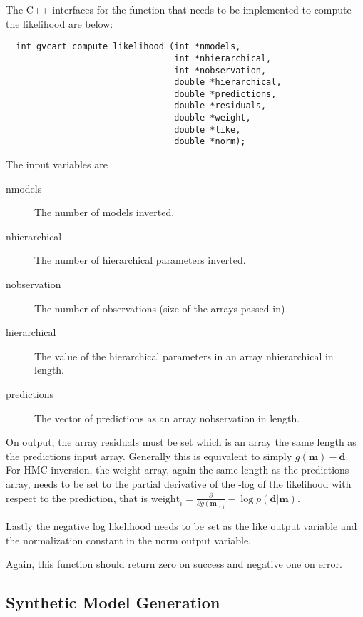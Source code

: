 \documentclass[a4paper,12pt]{article}
\begin{document}
The C++ interfaces for the function that needs to be implemented to
compute the likelihood are below:

\begin{verbatim}
  int gvcart_compute_likelihood_(int *nmodels,
                                 int *nhierarchical,
                                 int *nobservation,
                                 double *hierarchical,
                                 double *predictions, 
                                 double *residuals,
                                 double *weight,
                                 double *like,
                                 double *norm);
\end{verbatim}

The input variables are

\begin{description}
\item[nmodels] The number of models inverted.
\item[nhierarchical] The number of hierarchical parameters inverted.
\item[nobservation] The number of observations (size of the arrays passed in)
\item[hierarchical] The value of the hierarchical parameters in an array nhierarchical in length.
\item[predictions] The vector of predictions as an array nobservation in length.
\end{description}

On output, the array residuals must be set which is an array the same length as the
predictions input array. Generally this is equivalent to simply $g(\mathbf{m}) - \mathbf{d}$.
For HMC inversion, the weight array, again the same length as the predictions array, needs
to be set to the partial derivative of the -log of the likelihood with respect to the
prediction, that is $\mathrm{weight}_i = \frac{\partial}{\partial g(\mathbf{m})_i} -\log p(\mathbf{d}|\mathbf{m})$.

Lastly the negative log likelihood needs to be set as the like output variable and the normalization
constant in the norm output variable.

Again, this function should return zero on success and negative one on error.

\subsection{Synthetic Model Generation}
\end{document}
